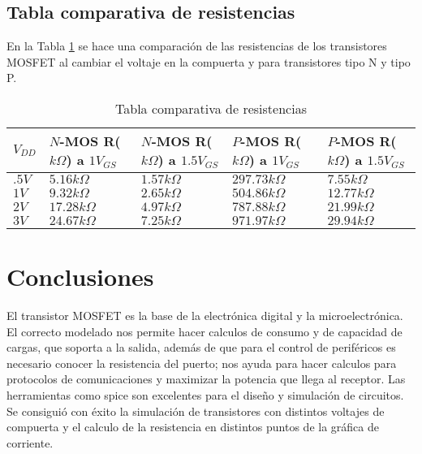 \documentclass[9pt,technote]{IEEEtran}
\begin{document}
	
	\subsection{Tabla comparativa de resistencias}
	En la Tabla \ref{Tabla:tabla de resistencias} se hace una comparación de las resistencias de los transistores MOSFET al cambiar el voltaje en la compuerta y para transistores tipo N y tipo P.
	\begin{table}[H]
			\centering
			\begin{tabular}{|p{.5cm}|p{1.5cm}|p{1.5cm}|p{1.5cm}|p{1.5cm}|}
				\hline
				\vfill
				$V_{DD}$ &$N$-MOS R($k\Omega$) a $1V_{GS}$&$N$-MOS R($k\Omega$) a $1.5V_{GS}$&$P$-MOS R($k\Omega$) a $1V_{GS}$&$P$-MOS R($k\Omega$) a $1.5V_{GS}$ \\
				\hline
				\vfill $.5V$ & \vfill$5.16 k\Omega$ & \vfill$1.57 k\Omega$ & \vfill$297.73 k\Omega$ & \vfill$7.55 k\Omega$ \\
				\vfill $1V$ & \vfill$9.32 k\Omega$ & \vfill$2.65 k\Omega$ & \vfill$504.86 k\Omega$ & \vfill$12.77 k\Omega$ \\
				\vfill $2V$ & \vfill$17.28 k\Omega$ & \vfill$4.97 k\Omega$ & \vfill$787.88 k\Omega$ & \vfill$21.99 k\Omega$ \\
				\vfill $3V$ & \vfill$24.67 k\Omega$ & \vfill$7.25 k\Omega$ & \vfill$971.97 k\Omega$ & \vfill$29.94 k\Omega$ \\
				\hline

			\end{tabular}
			\caption{Tabla comparativa de resistencias}
			\label{Tabla:tabla de resistencias}
		\end{table}
	
	\section*{Conclusiones}
	
	El transistor MOSFET es la base de la electrónica digital y la microelectrónica. El correcto modelado nos permite hacer calculos de consumo y de capacidad de cargas, que soporta a la salida, además de que para el control de periféricos es necesario conocer la resistencia del puerto; nos ayuda para hacer calculos para protocolos de comunicaciones y maximizar la potencia que llega al receptor. Las herramientas como spice son excelentes para el diseño y simulación de circuitos. Se consiguió con éxito la simulación de transistores con distintos voltajes de compuerta y el calculo de la resistencia en distintos puntos de la gráfica de corriente.
	

	
	
	
	
\end{document}
